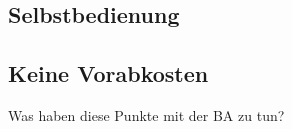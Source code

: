 \subsection{Selbstbedienung}

\subsection{Keine Vorabkosten}


Was haben diese Punkte mit der BA zu tun?
\begin{comment}
Advantages of Cloud Technology
As the technology has matured over the last decade, companies are moving to the
cloud to lower costs, reduce complexity, and increase flexibility. The cloud
provides scalable and powerful compute solutions, low-cost, reliable storage, and




addition, cloud technologies can be used to deploy solutions quickly and costeffectively around the world and on any device.
When you decouple from the data center, you’ll be able to:
x Decrease your TCO: Eliminate many of the costs related to building and
maintaining a data center or colocation deployment. Pay for only the
resources you consume.

x Reduce complexity: Reduce the need to manage infrastructure,
investigate licensing issues, or divert resources.
x Adjust capacity on the fly: Add or reduce resources, depending on
seasonal business needs, using infrastructure that is secure, reliable, and
broadly accessible.
x Reduce time to market: Design and develop new IT projects faster.
x Deploy quickly, even worldwide: Deploy applications across multiple
geographic areas.
x Increase efficiencies: Use automation to reduce or eliminate IT
management activities that waste time and resources.
x Innovate more: Spin up a new server and try out an idea. Each project
moves through the funnel more quickly because the cloud makes it faster
(and cheaper) to deploy, test, and launch new products and services.
x Spend your resources strategically: Switch to a DevOps model to free
your IT staff from operations and maintenance that can be handled by the
cloud services provider.
x Enhance security: Spend less time conducting security reviews on
infrastructure. Mature cloud providers have teams of people who focus on
security, offering best practices to ensure you’re compliant, no matter what
your industry.
\end{comment}




